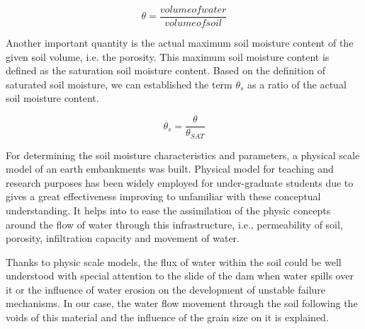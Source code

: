 \begin{equation}
    \theta = \frac{volume of water}{volume of soil}
\end{equation}

Another important quantity is the actual maximum soil moisture content of the given soil volume, i.e. the porosity. This maximum soil moisture content is defined as the saturation soil moisture content. Based on the definition of saturated soil moisture, we can established the term $\theta_s$ as a ratio of the actual soil moisture content.

\begin{equation}
    \theta_s= \frac{\theta}{\theta_{SAT}}
\end{equation}

For determining the soil moisture characteristics and parameters, a physical scale model of an earth embankments was built. Physical model for teaching and research purposes has been widely employed for under-graduate students due to gives a great effectiveness improving to unfamiliar with these conceptual understanding. It helps into to ease the assimilation  of  the  physic  concepts  around  the  flow  of  water  through  this  infrastructure,  i.e., permeability of soil, porosity, infiltration capacity and movement of water. 

Thanks to physic scale models,  the flux of water within the soil could be well understood with special attention to the slide of the dam when water spills over it or the influence of water erosion on the development of unstable failure mechanisms. In our case, the water flow movement through the soil following the voids of this material and the influence of the grain size on it is explained. 

\newpage
\newpage
